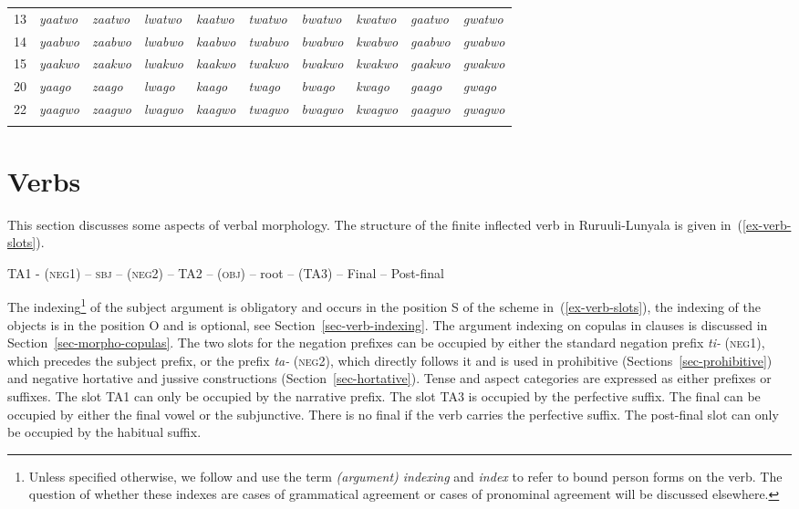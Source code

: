 \begin{sidewaystable}
\begin{tabular}{l l l l l l l l l l}
13 & \textit{yaatwo} & \textit{zaatwo} & \textit{lwatwo} & \textit{kaatwo} & \textit{twatwo} & \textit{bwatwo} & \textit{kwatwo} & \textit{gaatwo} & \textit{gwatwo}\\
14 & \textit{yaabwo} & \textit{zaabwo} & \textit{lwabwo} & \textit{kaabwo} & \textit{twabwo} & \textit{bwabwo} & \textit{kwabwo} & \textit{gaabwo} & \textit{gwabwo}\\
15 & \textit{yaakwo} & \textit{zaakwo} & \textit{lwakwo} & \textit{kaakwo} & \textit{twakwo} & \textit{bwakwo} & \textit{kwakwo} & \textit{gaakwo} & \textit{gwakwo}\\
20 & \textit{yaago} & \textit{zaago} & \textit{lwago} & \textit{kaago} & \textit{twago} & \textit{bwago} & \textit{kwago} & \textit{gaago} & \textit{gwago}\\
22 & \textit{yaagwo} & \textit{zaagwo} & \textit{lwagwo} & \textit{kaagwo} & \textit{twagwo} & \textit{bwagwo} & \textit{kwagwo} & \textit{gaagwo} & \textit{gwagwo}\\
\lspbottomrule
\end{tabular}
\label{tab-proposs3b}
\end{sidewaystable}

\newpage
\section{Verbs}\label{sec-morh-verb}

This section discusses some aspects of verbal morphology. 
The structure of the finite inflected verb in Ru\-ruu\-li\hyp{}Lu\-nya\-la is given in~(\ref{ex-verb-slots}). 

\ea \label{ex-verb-slots}
TA1 - (\textsc{neg}1) – \textsc{sbj} – (\textsc{neg}2) – TA2 – (\textsc{obj}) – root – (TA3) – Final – Post-final
\z

The indexing\footnote{Unless specified otherwise, we follow \citet{Haspelmath2013Argument} and use the term \textit{(argument) indexing} and \textit{index} to refer to bound person forms on the verb. The question of whether these indexes are cases of grammatical agreement or cases of pronominal agreement will be discussed elsewhere.} of the subject argument is obligatory and occurs in the position S of the scheme in~(\ref{ex-verb-slots}), 
the indexing of the objects is in the position O and is optional, see Section~\ref{sec-verb-indexing}. 
The argument indexing on copulas in clauses is discussed in Section~\ref{sec-morpho-copulas}. 
The two slots for the negation prefixes can be occupied by either the standard negation prefix \textit{ti-} (\textsc{neg}1), which precedes the subject prefix, 
or the prefix \textit{ta-} (\textsc{neg}2), which directly follows it and is used in prohibitive (Sections~\ref{sec-prohibitive}) and negative hortative and jussive constructions (Section~\ref{sec-hortative}). 
Tense and aspect categories are expressed as either prefixes or suffixes. 
The slot TA1 can only be occupied by the narrative prefix.  The slot TA3 is occupied by the perfective suffix. 
The final can be occupied by either the final vowel or the subjunctive. 
There is no final if the verb carries the perfective suffix. 
The post-final slot can only be occupied by the habitual suffix.


